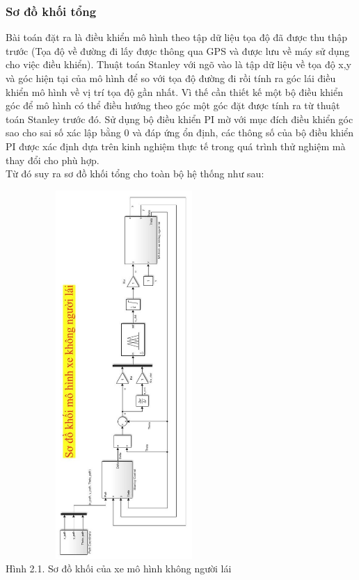 \documentclass[a4paper, 12pt]{article}
\begin{document}
\subsubsection{Sơ đồ khối tổng}
\hspace{0.5cm}
Bài toán đặt ra là điều khiển mô hình theo tập dữ liệu tọa độ đã được thu thập trước (Tọa độ về đường đi lấy được thông qua GPS và được lưu về máy sử dụng cho việc điều khiển). Thuật toán Stanley với ngõ vào là tập dữ liệu về tọa độ x,y và góc hiện tại của mô hình để so với tọa độ đường đi rồi tính ra góc lái điều khiển mô hình về vị trí tọa độ gần nhất. Vì thế cần thiết kế một bộ điều khiển góc để mô hình có thể điều hướng theo góc một góc đặt được tính ra từ thuật toán Stanley trước đó. Sử dụng bộ điều khiển PI mờ với mục đích điều khiển góc sao cho sai số xác lập bằng 0 và đáp ứng ổn định, các thông số của bộ điều khiển PI được xác định dựa trên kinh nghiệm thực tế trong quá trình thử nghiệm mà thay đổi cho phù hợp. \\\indent
Từ đó suy ra sơ đồ khối tổng cho toàn bộ hệ thống như sau:\\\newpage
\begin{center}
	\includegraphics[width=340px,height=530px]{images/SoDoKhoiTong_Ngang}\\
	Hình 2.1. Sơ đồ khối của xe mô hình không người lái
\end{center}
\end{document}
